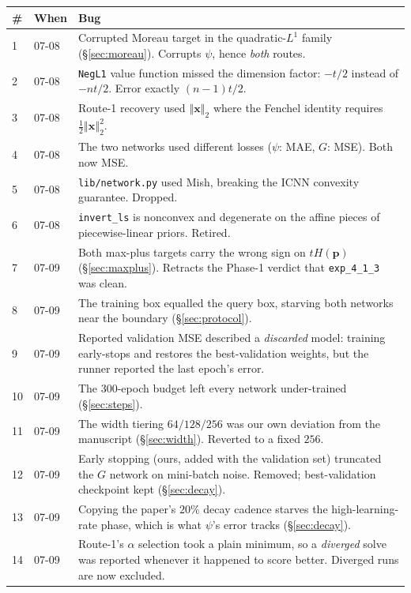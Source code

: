 \documentclass[11pt]{article}
\newcommand{\file}[1]{\texttt{#1}}
\newcommand{\bx}{\boldsymbol{x}}
\newcommand{\bp}{\boldsymbol{p}}
\newcommand{\norm}[1]{\left\Vert #1 \right\Vert_{2}}
\newcommand{\normsq}[1]{\left\Vert #1 \right\Vert_{2}^{2}}
\begin{document}
\begin{center}
\begin{tabular}{@{}llp{}@{}}
\toprule
\# & When & Bug \\
\midrule
1 & 07-08 & Corrupted Moreau target in the quadratic-$L^{1}$ family
  (\S\ref{sec:moreau}). Corrupts $\psi$, hence \emph{both} routes. \\
2 & 07-08 & \texttt{NegL1} value function missed the dimension factor:
  $-t/2$ instead of $-nt/2$. Error exactly $(n-1)t/2$. \\
3 & 07-08 & Route-1 recovery used $\norm{\bx}$ where the Fenchel identity
  requires $\tfrac12\normsq{\bx}$. \\
4 & 07-08 & The two networks used different losses ($\psi$: MAE, $G$: MSE).
  Both now MSE. \\
5 & 07-08 & \file{lib/network.py} used Mish, breaking the ICNN convexity
  guarantee. Dropped. \\
6 & 07-08 & \texttt{invert\_ls} is nonconvex and degenerate on the affine
  pieces of piecewise-linear priors. Retired. \\
7 & 07-09 & Both max-plus targets carry the wrong sign on $tH(\bp)$
  (\S\ref{sec:maxplus}). Retracts the Phase-1 verdict that
  \file{exp\_4\_1\_3} was clean. \\
8 & 07-09 & The training box equalled the query box, starving both networks
  near the boundary (\S\ref{sec:protocol}). \\
9 & 07-09 & Reported validation MSE described a \emph{discarded} model:
  training early-stops and restores the best-validation weights, but the runner
  reported the last epoch's error. \\
10 & 07-09 & The $300$-epoch budget left every network under-trained
  (\S\ref{sec:steps}). \\
11 & 07-09 & The width tiering $64/128/256$ was our own deviation from the
  manuscript (\S\ref{sec:width}). Reverted to a fixed $256$. \\
12 & 07-09 & Early stopping (ours, added with the validation set) truncated the
  $G$ network on mini-batch noise. Removed; best-validation checkpoint kept
  (\S\ref{sec:decay}). \\
13 & 07-09 & Copying the paper's $20\%$ decay cadence starves the high-learning-
  rate phase, which is what $\psi$'s error tracks (\S\ref{sec:decay}). \\
14 & 07-09 & Route-1's $\alpha$ selection took a plain minimum, so a
  \emph{diverged} solve was reported whenever it happened to score better.
  Diverged runs are now excluded. \\
\bottomrule
\end{tabular}
\end{center}
\end{document}
